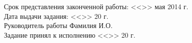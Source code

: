 Срок представления законченной работы: <<\underline{\phantom{232}}>> мая 2014 г.\\[10pt]

Дата выдачи задания: <<\underline{\phantom{232}}>> \underline{\phantom{февраль}} 20\underline{\phantom{23}} г.\\[10pt]

Руководитель работы  \underline{\phantom{длинная подпись}}  Фамилия И.О.\\[10pt]

Задание принял к исполнению <<\underline{\phantom{232}}>> \underline{\phantom{февраль}} 20\underline{\phantom{23}} г.\\[5pt]
\phantom{Задание принял к исполнению}\underline{\phantom{длинная подпись}}

\newpage
